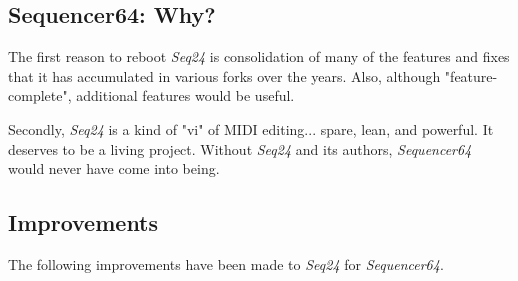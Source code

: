 \documentclass[
 11pt,
 twoside,
 a4paper,
 headinclude,
 footinclude,
 final                                 %
]{article}
\begin{document}
\subsection{Sequencer64: Why?}
\label{subsec:introduction_seq64_vs_others}

   The first reason to reboot \textsl{Seq24} is consolidation of many of the
   features and fixes that it has accumulated in various forks over the years.
   Also, although "feature-complete", additional features would be useful.

   Secondly, \textsl{Seq24} is a kind of "vi" of MIDI editing... spare,
   lean, and powerful.  It deserves to be a living project.  Without
   \textsl{Seq24} and its authors, \textsl{Sequencer64} would never have come
   into being.

\subsection{Improvements}
\label{subsec:improvements}

   The following improvements have been made to \textsl{Seq24} for
   \textsl{Sequencer64}.
\end{document}
